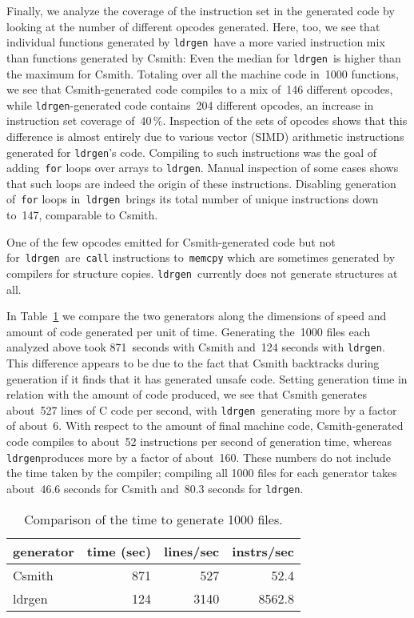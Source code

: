 \documentclass{llncs}
\newcommand\ldrgen{\texttt{ldrgen}}
\begin{document}
Finally, we analyze the coverage of the instruction set in the generated
code by looking at the number of different opcodes generated. Here, too, we
see that individual functions generated by \ldrgen\ have a more varied
instruction mix than functions generated by Csmith: Even the median for
\ldrgen\ is higher than the maximum for Csmith. Totaling over all the
machine code in~1000 functions, we see that Csmith-generated code compiles
to a mix of~146 different opcodes, while \ldrgen-generated code contains~204
different opcodes, an increase in instruction set coverage of~40\,\%.
Inspection of the sets of opcodes shows that this difference is almost
entirely due to various vector (SIMD) arithmetic instructions generated for
\ldrgen's code. Compiling to such instructions was the goal of
adding~\verb|for| loops over arrays to \ldrgen.  Manual inspection of some
cases shows that such loops are indeed the origin of these instructions.
Disabling generation of~\verb|for| loops in~\ldrgen\ brings its total number
of unique instructions down to~147, comparable to Csmith.

One of the few opcodes emitted for Csmith-generated code but not
for~\ldrgen\ are~\verb|call| instructions to~\verb|memcpy| which are
sometimes generated by compilers for structure copies. \ldrgen\ currently
does not generate structures at all.

In Table~\ref{tab:timings} we compare the two generators along the
dimensions of speed and amount of code generated per unit of time. Generating
the~1000 files each analyzed above took 871~seconds with Csmith and~124
seconds with \ldrgen. This difference appears to be due to the fact that
Csmith backtracks during generation if it finds that it has generated unsafe
code. Setting generation time in relation with the amount of code produced,
we see that Csmith generates about~527 lines of C code per second, with
\ldrgen\ generating more by a factor of about~6. With respect to the amount
of final machine code, Csmith-generated code compiles to about~52
instructions per second of generation time, whereas \ldrgen produces more by
a factor of about~160. These numbers do not include the time taken by the
compiler; compiling all 1000 files for each generator takes about~46.6
seconds for Csmith and~80.3 seconds for \ldrgen.

\begin{table}
\caption{Comparison of the time to generate 1000 files.}
\label{tab:timings}
\centering
\begin{tabular}{l@{\ } | @{\ }r@{\quad}r@{\quad}r}
    generator & time (sec) & lines/sec & instrs/sec \\
    \hline
    Csmith & 871 &  527 & 52.4 \\
    ldrgen & 124 & 3140 & 8562.8
\end{tabular}
\end{table}
\end{document}
